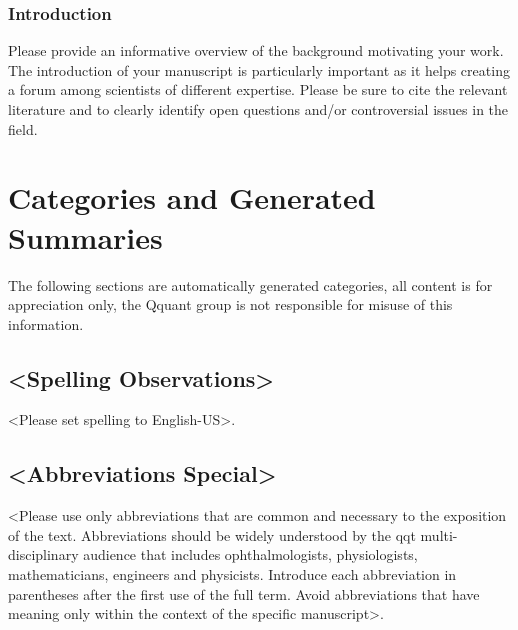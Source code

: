 \documentclass{qqtarticle}
\begin{document}
    \subsubsection{Introduction}
    Please provide an informative overview of the background motivating your work.
    The introduction of your manuscript is particularly important as it helps
    creating a forum among scientists of different expertise.  Please be sure to
    cite the relevant literature and to clearly identify open questions and/or
    controversial issues in the field.

    \section{Categories and Generated Summaries}
    The following sections are automatically generated categories, all content is for appreciation only, the Qquant group is not responsible for misuse of this information.

    \subsection{<Spelling Observations>}
    <Please set spelling to English-US>.

    \subsection{<Abbreviations Special>}
    <Please use only abbreviations that are common and necessary to the exposition
    of the text. Abbreviations should be widely understood by the qqt
    multi-disciplinary audience that includes ophthalmologists, physiologists,
    mathematicians, engineers and physicists. Introduce each abbreviation in
    parentheses after the first use of the full term. Avoid abbreviations that have
    meaning only within the context of the specific manuscript>.
\end{document}
